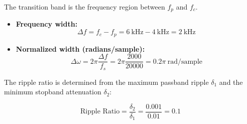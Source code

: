 \begin{solutionblock}
The transition band is the frequency region between $f_p$ and $f_c$.

\begin{itemize}
    \item \textbf{Frequency width:} 
    \[
    \Delta f = f_c - f_p = 6~\text{kHz} - 4~\text{kHz} = 2~\text{kHz}
    \]
    
    \item \textbf{Normalized width (radians/sample):} 
    \[
    \Delta \omega = 2\pi \frac{\Delta f}{f_s} = 2\pi \frac{2000}{20000} = 0.2\pi~\text{rad/sample}
    \]
    
\end{itemize}
\end{solutionblock}

\begin{solutionblock}
The ripple ratio is determined from the maximum passband ripple $\delta_1$ and the minimum stopband attenuation $\delta_2$:

\[
\text{Ripple Ratio} = \frac{\delta_2}{\delta_1} = \frac{0.001}{0.01} = 0.1
\]

\end{solutionblock}

